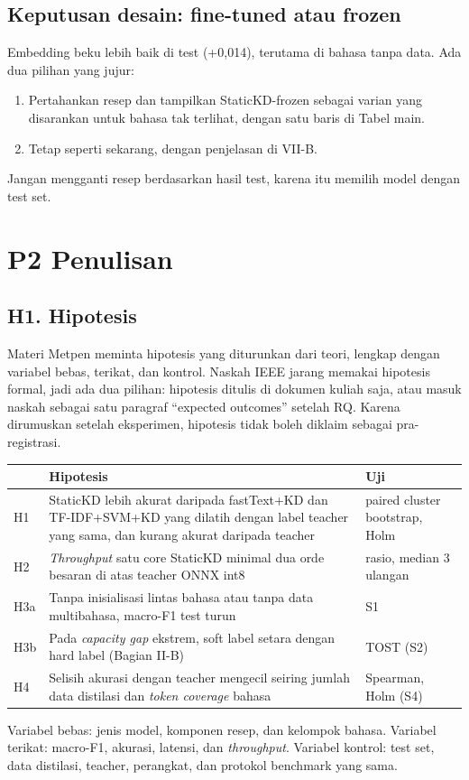 \documentclass[10pt,a4paper]{article}
\newcommand{\pt}{\textcolor{blue!60!black}{\textbf{P2}}}
\begin{document}
\subsection*{Keputusan desain: fine-tuned atau frozen}
Embedding beku lebih baik di test (+0,014), terutama di bahasa tanpa data. Ada dua pilihan yang jujur:
\begin{enumerate}
  \item Pertahankan resep dan tampilkan StaticKD-frozen sebagai varian yang disarankan untuk bahasa tak terlihat, dengan satu baris di Tabel main.
  \item Tetap seperti sekarang, dengan penjelasan di VII-B.
\end{enumerate}
Jangan mengganti resep berdasarkan hasil test, karena itu memilih model dengan test set.

\section{\pt{} Penulisan}

\subsection*{H1. Hipotesis}
Materi Metpen meminta hipotesis yang diturunkan dari teori, lengkap dengan variabel bebas, terikat, dan kontrol. Naskah IEEE jarang memakai hipotesis formal, jadi ada dua pilihan: hipotesis ditulis di dokumen kuliah saja, atau masuk naskah sebagai satu paragraf ``expected outcomes'' setelah RQ. Karena dirumuskan setelah eksperimen, hipotesis tidak boleh diklaim sebagai pra-registrasi.
\begin{longtable}{@{}p{}p{}p{}@{}}
\toprule
& Hipotesis & Uji\\
\midrule
H1 & StaticKD lebih akurat daripada fastText+KD dan TF-IDF+SVM+KD yang dilatih dengan label teacher yang sama, dan kurang akurat daripada teacher & paired cluster bootstrap, Holm\\
H2 & \emph{Throughput} satu core StaticKD minimal dua orde besaran di atas teacher ONNX int8 & rasio, median 3 ulangan\\
H3a & Tanpa inisialisasi lintas bahasa atau tanpa data multibahasa, macro-F1 test turun & S1\\
H3b & Pada \emph{capacity gap} ekstrem, soft label setara dengan hard label (Bagian II-B) & TOST (S2)\\
H4 & Selisih akurasi dengan teacher mengecil seiring jumlah data distilasi dan \emph{token coverage} bahasa & Spearman, Holm (S4)\\
\bottomrule
\end{longtable}
\noindent Variabel bebas: jenis model, komponen resep, dan kelompok bahasa. Variabel terikat: macro-F1, akurasi, latensi, dan \emph{throughput}. Variabel kontrol: test set, data distilasi, teacher, perangkat, dan protokol benchmark yang sama.
\end{document}
